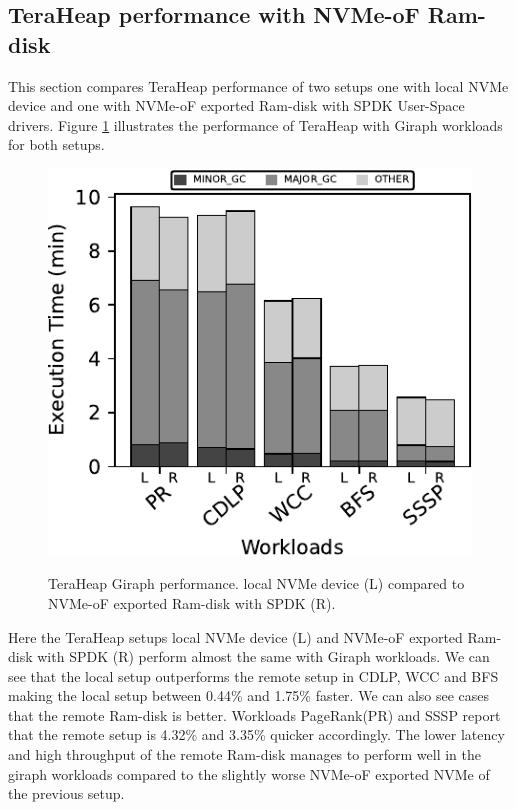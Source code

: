 \subsection{TeraHeap performance with NVMe-oF Ram-disk}
\par This section compares TeraHeap performance of two setups one with local NVMe device and one with NVMe-oF exported Ram-disk with SPDK User-Space drivers. Figure \ref{fig:ram_giraph} illustrates the performance of TeraHeap with Giraph workloads for both setups.
\begin{figure}[H]
  \includegraphics[width=\linewidth]{figures/ram_giraph.pdf}\\
\caption{TeraHeap Giraph performance. local NVMe device (L) compared to NVMe-oF exported Ram-disk with SPDK (R).}
\label{fig:ram_giraph}
\end{figure}
Here the TeraHeap setups local NVMe device (L) and NVMe-oF exported Ram-disk with
SPDK (R) perform almost the same with Giraph workloads. We can see that the local setup
outperforms the remote setup in CDLP, WCC and BFS making the local setup between 0.44\% and 1.75\% faster. We can also see cases that the remote Ram-disk is better. Workloads PageRank(PR) and SSSP report that the remote
setup is 4.32\% and 3.35\% quicker accordingly. The lower latency and high throughput of the remote Ram-disk manages to perform well in the giraph workloads compared to the slightly worse NVMe-oF exported NVMe of the previous setup.

